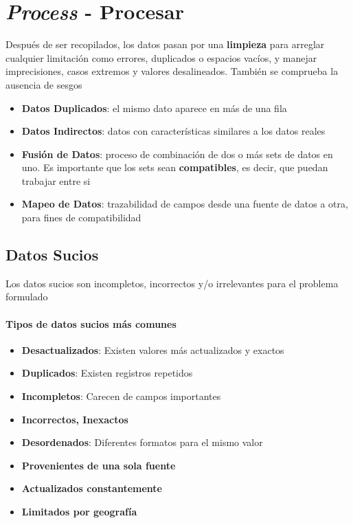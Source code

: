 \section{\textit{Process} - Procesar}
Después de ser recopilados, los datos pasan por una \textbf{limpieza} para arreglar cualquier limitación como errores, duplicados o espacios vacíos, y manejar imprecisiones, casos extremos y valores desalineados. También se comprueba la ausencia de sesgos
\begin{itemize}
    \item {\textbf{Datos Duplicados}: el mismo dato aparece en más de una fila}
    \item {\textbf{Datos Indirectos}: datos con características similares a los datos reales}
    \item {\textbf{Fusión de Datos}: proceso de combinación de dos o más sets de datos en uno. Es importante que los sets sean \textbf{compatibles}, es decir, que puedan trabajar entre si}
    \item {\textbf{Mapeo de Datos}: trazabilidad de campos desde una fuente de datos a otra, para fines de compatibilidad}
\end{itemize}

\subsection{Datos Sucios}
Los datos sucios son incompletos, incorrectos y/o irrelevantes para el problema formulado
\paragraph{Tipos de datos sucios más comunes}
\begin{itemize}
    \item {\textbf{Desactualizados}: Existen valores más actualizados y exactos}
    \item {\textbf{Duplicados}: Existen registros repetidos}
    \item {\textbf{Incompletos}: Carecen de campos importantes}
    \item {\textbf{Incorrectos, Inexactos}}
    \item {\textbf{Desordenados}: Diferentes formatos para el mismo valor}
    \item {\textbf{Provenientes de una sola fuente}}
    \item {\textbf{Actualizados constantemente}}
    \item {\textbf{Limitados por geografía}}
\end{itemize}

